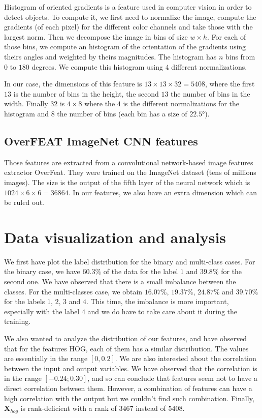 \documentclass{article} %
\begin{document}
Histogram of oriented gradients is a feature used in computer vision in order to detect objects. To compute it, we first need to normalize the image, compute the gradients (of each pixel) for the different color channels and take those with the largest norm. Then we decompose the image in bins of size $w \times h$. For each of those bins, we compute an histogram of the orientation of the gradients using theirs angles and weighted by theirs magnitudes. The histogram has $n$ bins from $0$ to $180$ degrees. We compute this histogram using $4$ different normalizations.

In our case, the dimensions of this feature is $13 \times 13 \times 32=5408$, where the first $13$ is the number of bins in the height, the second $13$ the number of bins in the width. Finally $32$ is $4 \times 8$ where the $4$ is the different normalizations for the histogram and $8$ the number of bins (each bin has a size of $22.5°$). 

\subsection{OverFEAT ImageNet CNN features}

Those features are extracted from a convolutional network-based image features extractor OverFeat. They were trained on the ImageNet dataset (tens of millions images). The size is the output of the fifth layer of the neural network which is $1024 \times 6 \times 6 = 36864$. In our features, we also have an extra dimension which can be ruled out.

\section{Data visualization and analysis}

We first have plot the label distribution for the binary and multi-class cases. For the binary case, we have $60.3\%$ of the data for the label $1$ and $39.8\%$ for the second one. We have observed that there is a small imbalance between the classes. For the multi-classes case, we obtain $16.07\%$, $19.37\%$, $24.87\%$ and $39.70\%$ for the labels $1$, $2$, $3$ and $4$. This time, the imbalance is more important, especially with the label $4$ and we do have to take care about it during the training.

We also wanted to analyze the distribution of our features, and have observed that for the features HOG, each of them has a similar distribution. The values are essentially in the range $[0, 0.2]$. We are also interested about the correlation between the input and output variables. We have observed that the correlation is in the range $[-0.24 ;0.30]$, and so can conclude that features seem not to have a direct correlation between them. However, a combination of features can have a high correlation with the output but we couldn't find such combination. Finally, $\mathbf{X}_{hog}$ is rank-deficient with a rank of $3467$ instead of $5408$.
\end{document}
